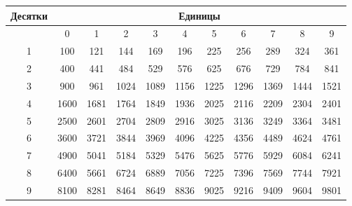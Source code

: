 \documentclass[a5paper, 8pt]{extarticle}
\begin{document}
\begin{center}
{\setlength{\extrarowheight}{5pt}
\begin{tabular}{|c|c|c|c|c|c|c|c|c|c|c|}
\hline 
\rowcolor{Gray}
Десятки & \multicolumn{10}{c|}{Единицы} \\ 
\hline 
& 0 & 1 & 2 & 3 & 4 & 5 & 6 & 7 & 8 & 9 \\ 
\hline 
\rowcolor{Gray}
1 & 100 & 121 & 144 & 169 & 196 & 225 & 256 & 289 & 324 & 361 \\ 
\hline 
2 & 400 & 441 & 484 & 529 & 576 & 625 & 676 & 729 & 784 & 841 \\ 
\hline 
\rowcolor{Gray}
3 & 900 & 961 & 1024 & 1089 & 1156 & 1225 & 1296 & 1369 & 1444 & 1521 \\ 
\hline 
4 & 1600 & 1681 & 1764 & 1849 & 1936 & 2025 & 2116 & 2209 & 2304 & 2401 \\ 
\hline 
\rowcolor{Gray}
5 & 2500 & 2601 & 2704 & 2809 & 2916 & 3025 & 3136 & 3249 & 3364 & 3481 \\ 
\hline 
6 & 3600 & 3721 & 3844 & 3969 & 4096 & 4225 & 4356 & 4489 & 4624 & 4761 \\ 
\hline 
\rowcolor{Gray}
7 & 4900 & 5041 & 5184 & 5329 & 5476 & 5625 & 5776 & 5929 & 6084 & 6241 \\ 
\hline 
8 & 6400 & 5661 & 6724 & 6889 & 7056 & 7225 & 7396 & 7569 & 7744 & 7921 \\ 
\hline 
\rowcolor{Gray}
9 & 8100 & 8281 & 8464 & 8649 & 8836 & 9025 & 9216 & 9409 & 9604 & 9801 \\ 
\hline 
\end{tabular} 
}
\end{center}
\end{document}
